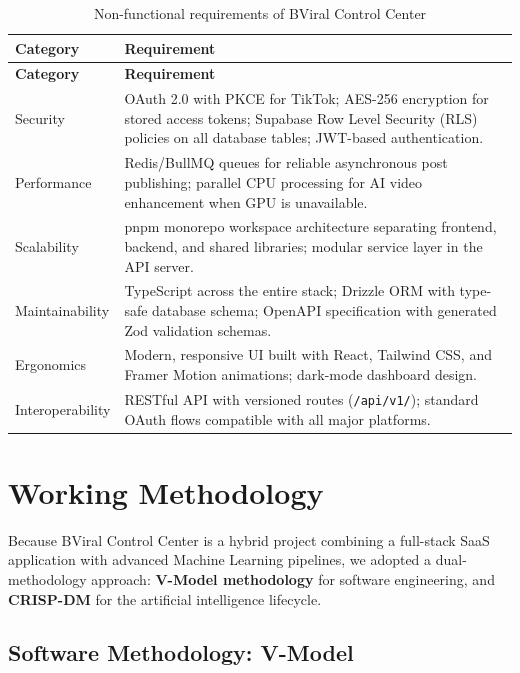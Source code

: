 \begin{longtable}{|p{4cm}|p{10cm}|}
\caption{Non-functional requirements of BViral Control Center}
\label{tab:non-functional-requirements} \\
\hline
\textbf{Category} & \textbf{Requirement} \\
\hline
\endfirsthead

\hline
\textbf{Category} & \textbf{Requirement} \\
\hline
\endhead

Security & OAuth 2.0 with PKCE for TikTok; AES-256 encryption for stored access tokens; Supabase Row Level Security (RLS) policies on all database tables; JWT-based authentication. \\
\hline

Performance & Redis/BullMQ queues for reliable asynchronous post publishing; parallel CPU processing for AI video enhancement when GPU is unavailable. \\
\hline

Scalability & pnpm monorepo workspace architecture separating frontend, backend, and shared libraries; modular service layer in the API server. \\
\hline

Maintainability & TypeScript across the entire stack; Drizzle ORM with type-safe database schema; OpenAPI specification with generated Zod validation schemas. \\
\hline

Ergonomics & Modern, responsive UI built with React, Tailwind CSS, and Framer Motion animations; dark-mode dashboard design. \\
\hline

Interoperability & RESTful API with versioned routes (\texttt{/api/v1/}); standard OAuth flows compatible with all major platforms. \\
\hline
\end{longtable}

\section{Working Methodology}

Because BViral Control Center is a hybrid project combining a full-stack SaaS application with advanced Machine Learning pipelines, we adopted a dual-methodology approach: \textbf{V-Model methodology} for software engineering, and \textbf{CRISP-DM} for the artificial intelligence lifecycle.

\subsection{Software Methodology: V-Model}

